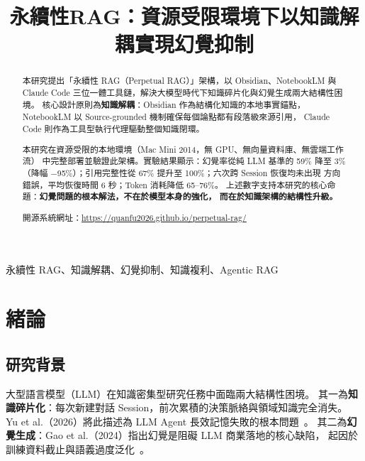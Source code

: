 \documentclass[conference]{IEEEtran}
\begin{document}
\title{永續性RAG：資源受限環境下以知識解耦實現幻覺抑制}

\author{
}

\maketitle

\begin{abstract}
本研究提出「永續性 RAG（Perpetual RAG）」架構，以 Obsidian、NotebookLM 與
Claude Code 三位一體工具鏈，解決大模型時代下知識碎片化與幻覺生成兩大結構性困境。
核心設計原則為\textbf{知識解耦}：Obsidian 作為結構化知識的本地事實錨點，
NotebookLM 以 Source-grounded 機制確保每個論點都有段落級來源引用，
Claude Code 則作為工具型執行代理驅動整個知識閉環。

本研究在資源受限的本地環境（Mac Mini 2014，無 GPU、無向量資料庫、無雲端工作流）
中完整部署並驗證此架構。實驗結果顯示：幻覺率從純 LLM 基準的 59\% 降至 3\%
（降幅 $-$95\%）；引用完整性從 67\% 提升至 100\%；六次跨 Session 恢復均未出現
方向錯誤，平均恢復時間 6 秒；Token 消耗降低 65--76\%。
上述數字支持本研究的核心命題：\textbf{幻覺問題的根本解法，不在於模型本身的強化，
而在於知識架構的結構性升級。}

開源系統網址：\url{https://quanfu2026.github.io/perpetual-rag/}
\end{abstract}

\begin{IEEEkeywords}
永續性 RAG、知識解耦、幻覺抑制、知識複利、Agentic RAG
\end{IEEEkeywords}

\section{緒論}

\subsection{研究背景}

大型語言模型（LLM）在知識密集型研究任務中面臨兩大結構性困境。
其一為\textbf{知識碎片化}：每次新建對話 Session，前次累積的決策脈絡與領域知識完全消失。
Yu et al.（2026）將此描述為 LLM Agent 長效記憶失敗的根本問題~\cite{yu2026agemem}。
其二為\textbf{幻覺生成}：Gao et al.（2024）指出幻覺是阻礙 LLM 商業落地的核心缺陷，
起因於訓練資料截止與語義過度泛化~\cite{gao2024rag}。
\end{document}
